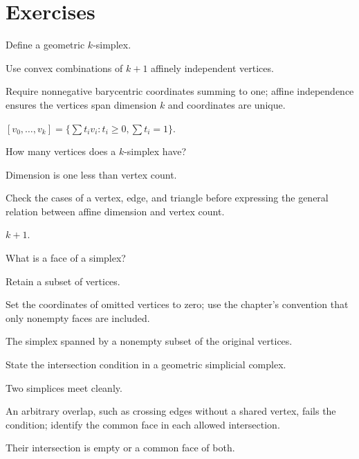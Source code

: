 \section{Exercises}

\begin{exercise}\label{exr:viii15-01}
Define a geometric \(k\)-simplex.
\end{exercise}
\begin{hint}
Use convex combinations of \(k+1\) affinely independent vertices.

Require nonnegative barycentric coordinates summing to one; affine independence ensures the vertices span dimension \(k\) and coordinates are unique.
\end{hint}
\begin{solution}
\([v_0,\dots,v_k]=\{\sum t_iv_i:t_i\ge0,\sum t_i=1\}\).
\end{solution}

\begin{exercise}\label{exr:viii15-02}
How many vertices does a \(k\)-simplex have?
\end{exercise}
\begin{hint}
Dimension is one less than vertex count.

Check the cases of a vertex, edge, and triangle before expressing the general relation between affine dimension and vertex count.
\end{hint}
\begin{solution}
\(k+1\).
\end{solution}

\begin{exercise}\label{exr:viii15-03}
What is a face of a simplex?
\end{exercise}
\begin{hint}
Retain a subset of vertices.

Set the coordinates of omitted vertices to zero; use the chapter's convention that only nonempty faces are included.
\end{hint}
\begin{solution}
The simplex spanned by a nonempty subset of the original vertices.
\end{solution}

\begin{exercise}\label{exr:viii15-04}
State the intersection condition in a geometric simplicial complex.
\end{exercise}
\begin{hint}
Two simplices meet cleanly.

An arbitrary overlap, such as crossing edges without a shared vertex, fails the condition; identify the common face in each allowed intersection.
\end{hint}
\begin{solution}
Their intersection is empty or a common face of both.
\end{solution}

